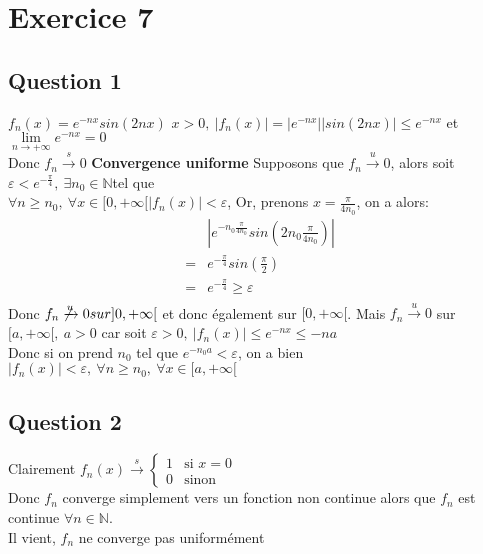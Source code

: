 \documentclass[td5.tex]{subfiles}
\begin{document}
\section{Exercice 7}
\subsection{Question 1}
$f_n(x) = e^{-nx}sin(2nx)$
$x > 0,~ |f_n(x)| = |e^{-nx}||sin(2nx)| \leq e^{-nx}$ et $\lim\limits_{n \to + \infty} e^{-nx} = 0$ \\
Donc $f_n \xrightarrow{s} 0$
\textbf{Convergence uniforme}
Supposons que $f_n \xrightarrow{u} 0$, alors soit $\varepsilon < e^{-\frac{\pi}{4}},~\exists n_0 \in \mathbb{N}$tel que \\
$\forall n \geq n_0,~\forall x \in [0, +\infty[ |f_n(x)| < \varepsilon$,
Or, prenons $x = \frac{\pi}{4n_0}$, on a alors: \\
\begin{align*}
  &|e^{-n_0 \frac{\pi}{4n_0}} sin(2n_0 \frac{\pi}{4n_0})| \\
  = &e^{- \frac{\pi}{4}} sin(\frac{\pi}{2})\\
  = &e^{- \frac{\pi}{4}} \geq \varepsilon \\
\end{align*}
Donc $f_n \not\xrightarrow{u} 0 sur ]0, +\infty[$ et donc également sur $[0, +\infty[$.
Mais $f_n \xrightarrow{u} 0$ sur $[a, +\infty[,~a > 0$
car soit $\varepsilon > 0,~|f_n(x)| \leq e^{-nx} \leq {-na}$ \\
Donc si on prend $n_0$ tel que $e^{-n_0 a} < \varepsilon$,
on a bien $|f_n(x)| < \varepsilon,~\forall n\geq n_0,~\forall x \in [a, +\infty[$

\subsection{Question 2}
Clairement
$f_n(x) \xrightarrow{s} \left\{
  \begin{array}{ll}
      1 & \mbox{si } x = 0 \\
      0 & \mbox{sinon}
    \end{array}
  \right.
$ \\
Donc $f_n$ converge simplement vers un fonction non continue alors que $f_n$
est continue $\forall n \in \mathbb{N}$. \\
Il vient, $f_n$ ne converge pas uniformément
\end{document}
